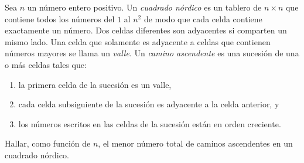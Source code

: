 Sea $n$ un número entero positivo. Un \emph{cuadrado nórdico} es un tablero de $n\times n$ que contiene todos los números del $1$ al $n^2$ de modo que cada celda contiene exactamente un número. Dos celdas diferentes son adyacentes si comparten un mismo lado. Una celda que solamente es adyacente a celdas que contienen números mayores se llama un \emph{valle}. Un \emph{camino ascendente} es una sucesión de una o más celdas tales que:
\begin{enumerate}
 \item  la primera celda de la sucesión es un valle,
 \item  cada celda subsiguiente de la sucesión es adyacente a la celda anterior, y
 \item  los números escritos en las celdas de la sucesión están en orden creciente.
 \end{enumerate} 
Hallar, como función de $n$, el menor número total de caminos ascendentes en un cuadrado nórdico.